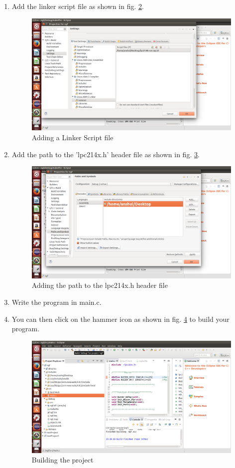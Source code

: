 \documentclass[20pt]{report}
\begin{document}
\begin{enumerate}
\begin{figure}[!h]
\label{ecl6}
\end{figure}
\item Add the linker script file as shown in fig. \ref{ecl7}.
\begin{figure}[!h]
\centering
\includegraphics[width=0.7\linewidth]{ecl7}
\caption{Adding a Linker Script file}
\label{ecl7}
\end{figure}
\item Add the path to the 'lpc214x.h' header file as shown in fig. \ref{ecl8}.
\begin{figure}[!h]
\centering
\includegraphics[width=0.7\linewidth]{ecl8}
\caption{Adding the path to the lpc214x.h header file}
\label{ecl8}
\end{figure}
\item Write the program in main.c.
\item You can then click on the hammer icon as shown in fig. \ref{ecl9} to build your program.
\begin{figure}[!h]
\centering
\includegraphics[width=0.7\linewidth]{ecl9}
\caption{Building the project}
\label{ecl9}
\end{figure}
\end{enumerate}
\end{document}
